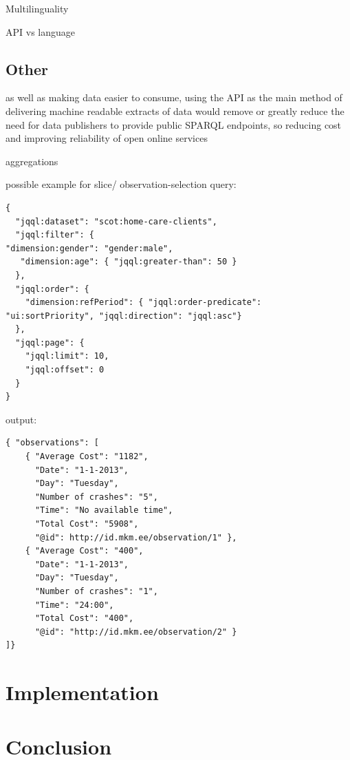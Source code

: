 \documentclass{llncs}
\begin{document}
Multilinguality

API vs language

\subsection{Other}


as well as making data easier to consume, using the API as the main method of delivering machine readable extracts of data would remove or greatly reduce the need for data publishers to provide public SPARQL endpoints, so reducing cost and improving reliability of open online services

aggregations


possible example for slice/ observation-selection query:
\begin{verbatim} 
{ 
  "jqql:dataset": "scot:home-care-clients",
  "jqql:filter": {
"dimension:gender": "gender:male",
   "dimension:age": { "jqql:greater-than": 50 }
  },
  "jqql:order": {
    "dimension:refPeriod": { "jqql:order-predicate": "ui:sortPriority", "jqql:direction": "jqql:asc"}
  },
  "jqql:page": {
    "jqql:limit": 10,
    "jqql:offset": 0
  }
}
\end{verbatim}

output:
\begin{verbatim} 
{ "observations": [ 
	{ "Average Cost": "1182", 
   	  "Date": "1-1-2013", 
	  "Day": "Tuesday", 
	  "Number of crashes": "5",
	  "Time": "No available time",
      "Total Cost": "5908", 
	  "@id": http://id.mkm.ee/observation/1" }, 
	{ "Average Cost": "400",
	  "Date": "1-1-2013",
	  "Day": "Tuesday",
	  "Number of crashes": "1",
	  "Time": "24:00",
 	  "Total Cost": "400",
	  "@id": "http://id.mkm.ee/observation/2" }
]}
\end{verbatim}

\section{Implementation}\label{sec:impl}

\section{Conclusion}\label{sec:conclusion}






\end{document}
